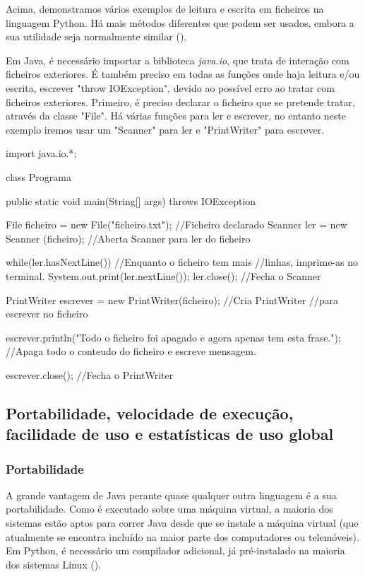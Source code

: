 \documentclass[11pt,openright,twoside]{report}
\begin{document}
Acima, demonstramos vários exemplos de leitura e escrita em ficheiros na linguagem Python. Há mais métodos diferentes que podem ser usados, embora a sua utilidade seja normalmente similar (\cite{Guiaodoze}).
\medskip

Em Java, é necessário importar a biblioteca \textit{java.io}, que trata de interação com ficheiros exteriores. É também preciso em todas as funções onde haja leitura e/ou escrita, escrever "throw IOException", devido ao possível erro ao tratar com ficheiros exteriores. Primeiro, é preciso declarar o ficheiro que se pretende tratar, através da classe "File". Há várias funções para ler e escrever, no entanto neste exemplo iremos usar um "Scanner" para ler e "PrintWriter" para escrever.

\smallskip
\begin{Java}
import java.io.*;

class Programa {

  public static void main(String[] args) throws IOException { 
	File ficheiro = new File("ficheiro.txt");										//Ficheiro declarado
	Scanner ler = new Scanner (ficheiro);											//Aberta Scanner para ler do ficheiro
	
	while(ler.hasNextLine()){				//Enquanto o ficheiro tem mais //linhas, imprime-as no terminal.
		System.out.print(ler.nextLine());	
	}
	ler.close();									//Fecha o Scanner
	
	PrintWriter escrever = new PrintWriter(ficheiro);	//Cria PrintWriter //para escrever no ficheiro
	
	escrever.println("Todo o ficheiro foi apagado e agora apenas tem esta frase.");	//Apaga todo o conteudo do ficheiro e escreve mensagem.
	
	escrever.close();								//Fecha o PrintWriter

  }
}
\end{Java}


\subsection{Portabilidade, velocidade de execução, facilidade de uso e estatísticas de uso global}
\medskip

\subsubsection{Portabilidade}
A grande vantagem de Java perante quase qualquer outra linguagem é a sua portabilidade. Como é executado sobre uma máquina virtual, a maioria dos sistemas estão aptos para correr Java desde que se instale a máquina virtual (que atualmente se encontra incluído na maior parte dos computadores ou telemóveis). Em Python, é necessário um compilador adicional, já pré-instalado na maioria dos sistemas Linux (\cite{Udemypython}).
\medskip
\end{document}
